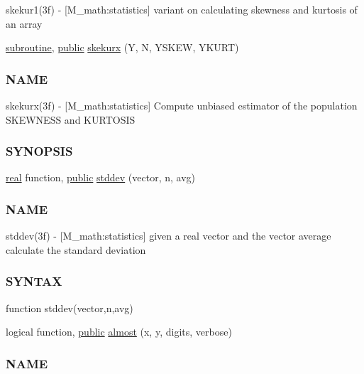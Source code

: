 \begin{DoxyCompactItemize}
\begin{DoxyCompactList}
skekur1(3f) -\/ \mbox{[}M\+\_\+math\+:statistics\mbox{]} variant on calculating skewness and kurtosis of an array \end{DoxyCompactList}\item 
\hyperlink{M__stopwatch_83_8txt_acfbcff50169d691ff02d4a123ed70482}{subroutine}, \hyperlink{M__stopwatch_83_8txt_a2f74811300c361e53b430611a7d1769f}{public} \hyperlink{namespacem__math_a7c595127392d65cef1e34cebdb49b27c}{skekurx} (Y, N, Y\+S\+K\+EW, Y\+K\+U\+RT)
\begin{DoxyCompactList}\small\item\em \subsubsection*{N\+A\+ME}

skekurx(3f) -\/ \mbox{[}M\+\_\+math\+:statistics\mbox{]} Compute unbiased estimator of the population S\+K\+E\+W\+N\+E\+SS and K\+U\+R\+T\+O\+S\+IS \subsubsection*{S\+Y\+N\+O\+P\+S\+IS}\end{DoxyCompactList}\item 
\hyperlink{read__watch_83_8txt_abdb62bde002f38ef75f810d3a905a823}{real} function, \hyperlink{M__stopwatch_83_8txt_a2f74811300c361e53b430611a7d1769f}{public} \hyperlink{namespacem__math_af6b04705727dc68a6e2eeff3a0e71cf1}{stddev} (vector, n, avg)
\begin{DoxyCompactList}\small\item\em \subsubsection*{N\+A\+ME}

stddev(3f) -\/ \mbox{[}M\+\_\+math\+:statistics\mbox{]} given a real vector and the vector average calculate the standard deviation \subsubsection*{S\+Y\+N\+T\+AX}

function stddev(vector,n,avg) \end{DoxyCompactList}\item 
logical function, \hyperlink{M__stopwatch_83_8txt_a2f74811300c361e53b430611a7d1769f}{public} \hyperlink{namespacem__math_a5c6526b86e62cffde2dc20e53fd3be22}{almost} (x, y, digits, verbose)
\begin{DoxyCompactList}\small\item\em \subsubsection*{N\+A\+ME}


\end{DoxyCompactList}
\end{DoxyCompactItemize}
